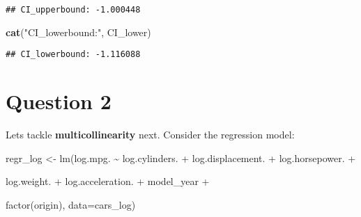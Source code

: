 \documentclass[
]{article}
\newenvironment{Shaded}{\begin{snugshade}}{\end{snugshade}}
\newcommand{\FloatTok}[1]{\textcolor[rgb]{0.00,0.00,0.81}{#1}}
\newcommand{\FunctionTok}[1]{\textcolor[rgb]{0.13,0.29,0.53}{\textbf{#1}}}
\newcommand{\NormalTok}[1]{#1}
\newcommand{\OtherTok}[1]{\textcolor[rgb]{0.56,0.35,0.01}{#1}}
\newcommand{\SpecialCharTok}[1]{\textcolor[rgb]{0.81,0.36,0.00}{\textbf{#1}}}
\newcommand{\StringTok}[1]{\textcolor[rgb]{0.31,0.60,0.02}{#1}}
\begin{document}
\begin{Shaded}
\end{Shaded}

\begin{verbatim}
## CI_upperbound: -1.000448
\end{verbatim}

\begin{Shaded}
\begin{Highlighting}[]
\FunctionTok{cat}\NormalTok{(}\StringTok{"CI\_lowerbound:"}\NormalTok{, CI\_lower)}
\end{Highlighting}
\end{Shaded}

\begin{verbatim}
## CI_lowerbound: -1.116088
\end{verbatim}

\hypertarget{question-2}{%
\section{Question 2}\label{question-2}}

Let\textquotesingle s tackle \textbf{multicollinearity} next. Consider
the regression model:

regr\_log \textless- lm(log.mpg. \textasciitilde{} log.cylinders. +
log.displacement. + log.horsepower. +

log.weight. + log.acceleration. + model\_year +

factor(origin), data=cars\_log)
\end{document}
